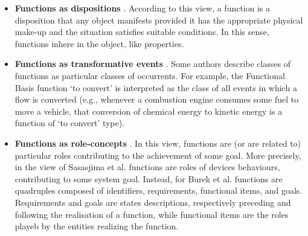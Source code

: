 \documentclass[
]{ceurart}
\begin{document}
\begin{itemize}
  \item \textbf{Functions as dispositions} \cite{arpFunctionRoleDisposition2008, barryBasicFormalOntology2015}. According to this view, a function is a disposition that any object manifests provided it has the appropriate physical make-up and the situation satisfies suitable conditions. In this sense, functions inhere in the object, like properties. 
  \item \textbf{Functions as transformative events} \cite{borgoFormalizationFunctionsOperations2011, garbaczTwoOntologydrivenFormalisations2011, garbaczStandardTaxonomyArtifact2005}.
  Some authors describe classes of functions as particular classes of occurrents. For example, the Functional Basis function `to convert' is interpreted as the class of all events in which a flow is converted (e.g., whenever a combustion engine consumes some fuel to move a vehicle, that conversion of chemical energy to kinetic energy is a function of `to convert' type).%
  \item \textbf{Functions as role-concepts} \cite{sasajimaFBRLFunctionBehavior1995,burekToplevelOntologyFunctions2006}. In this view, functions are (or are related to) particular roles contributing to the achievement of some goal. More precisely, in the view of Sasasjima et al. \cite{sasajimaFBRLFunctionBehavior1995} functions are roles of devices behaviours, contributing to some system goal. Instead, for Burek et al. \cite{burekToplevelOntologyFunctions2006} functions are quadruples composed of identifiers, requirements, functional items, and goals. Requirements and goals are states descriptions, respectively preceding and following the realisation of a function, while functional items are the roles playeb by the entities realizing the function. 
\end{itemize}
\end{document}
